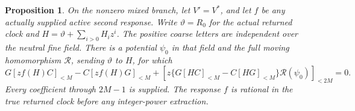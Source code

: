 \documentclass[11pt,a4paper]{amsart}
\numberwithin{equation}{section}
\theoremstyle{plain}
\newtheorem{proposition}[theorem]{Proposition}
\theoremstyle{definition}
\begin{document}
\begin{proposition}\label{ph:stationary-packet}
On the nonzero mixed branch, let \(V'=V^*\), and let \(f\) be any actually
supplied active second response.  Write \(\vartheta=R_0\) for the
actual returned clock and \(H=\vartheta+\sum_{i>0}H_i z^i\).  The
positive coarse letters are independent over the neutral fine field.
There is a potential \(\psi_0\) in that field and the full moving
homomorphism \(\mathcal R\), sending \(\vartheta\) to \(H\), for which
\begin{equation}\label{ph:stationary-identity}
 G[zf(H)C]_{<M}-C[zf(H)G]_{<M}
       +[z\{G[HC]_{<M}-C[HG]_{<M}\}\mathcal R(\psi_0)]_{<2M}=0.
\end{equation}
Every coefficient through \(2M-1\) is supplied.  The response \(f\) is
rational in the true returned clock before any integer-power extraction.
\end{proposition}
\end{document}
